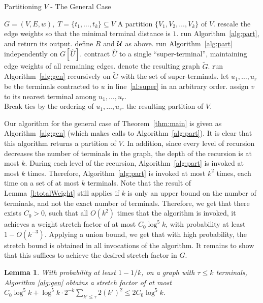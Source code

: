 \documentclass[twoside,leqno,twocolumn]{article}
\newtheorem{lemma}[theorem]{Lemma}
\providecommand{\eqdef}{:=}
\newcommand{\calD}{{\mathcal D}}
\begin{document}
\begin{algorithm}[t]
\caption{Partitioning $V$ - The General Case}
\label{alg:gen}
\begin{algorithmic}[1]
\REQUIRE $G = (V,E,w),\; T =\{t_1,\ldots,t_k\}\subseteq V$
\ENSURE A partition $\{V_1,V_2,\ldots,V_k\}$ of $V$.
\STATE rescale the edge weights so that the minimal terminal distance is $1$.
\IF {$\calD \eqdef \max_{u,v \in T}d_G(u,v) \le 2^{k^3}$}
\STATE run Algorithm~\ref{alg:part}, and return its output.
\ELSE
\STATE define $R$ and ${\cal U}$ as above.
\STATE run Algorithm~\ref{alg:part} independently on $G[\hat{U}]$.
\STATE contract $\hat{U}$ to a single ``super-terminal'', maintaining edge weights of all remaining edges. \label{al:super}
\ENDFOR
\STATE denote the resulting graph $\tilde{G}$. \STATE run Algorithm~\ref{alg:gen} recursively on $\tilde{G}$ with the set of super-terminals.
\STATE let $u_1,\ldots,u_r$ be the terminals contracted to $u$ in line~\ref{al:super} in an arbitrary order.
\STATE assign $v$ to its nearest terminal among $u_1,\ldots,u_r$. \\
Break ties by the ordering of $u_1,\ldots,u_r$. 
\ENDFOR
\ENDFOR
\ENDIF
\RETURN the resulting partition of $V$.
\end{algorithmic}
\end{algorithm}

Our algorithm for the general case of Theorem~\ref{thm:main} is given 
as Algorithm~\ref{alg:gen} (which makes calls to Algorithm~\ref{alg:part}).
It is clear that this algorithm returns a partition of $V$. 
In addition, since every level of recursion decreases the number of terminals in the graph, the depth of the recursion is at most $k$. During each level of the recursion, Algorithm~\ref{alg:part} is invoked at most $k$ times. Therefore, Algorithm~\ref{alg:part} is invoked at most $k^2$ times, each time on a set of at most $k$ terminals. Note that the result of Lemma~\ref{l:totalWeight} still applies if $k$ is only an upper bound on the number of terminals, and not the exact number of terminals. Therefore, we get that there exists $C_0>0$, such that all $O(k^2)$ times that the algorithm is invoked, it achieves a weight stretch factor of at most $C_0\log^5k$, with probability at least $1 - O(k^{-3})$. Applying a union bound, we get that with high probability, the stretch bound is obtained in all invocations of the algorithm. It remains to show that this suffices to achieve the desired stretch factor in $G$. 
\begin{lemma} \label{l:discard}
With probability at least $1 - 1/k$, on a graph with $\tau \le k$ terminals, 
Algorithm \ref{alg:gen} obtains a stretch factor of at most $C_0 \log^5 k + \log^5 k \cdot 2^{-k} \sum_{k' \le \tau}{2(k')^2} \le 2C_0 \log^5k$.
\end{lemma}
\end{document}
